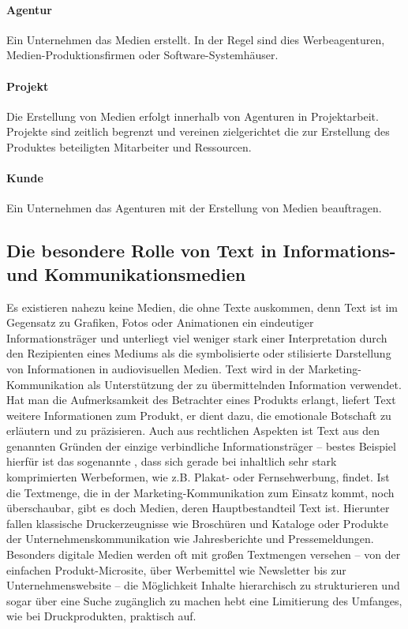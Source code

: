 \paragraph{Agentur} Ein Unternehmen das Medien erstellt. In der Regel sind dies Werbeagenturen, Medien-Produktionsfirmen oder Software-Systemhäuser. 

\paragraph{Projekt} Die Erstellung von Medien erfolgt innerhalb von Agenturen in Projektarbeit. Projekte sind zeitlich begrenzt und vereinen zielgerichtet die zur Erstellung des Produktes beteiligten Mitarbeiter und Ressourcen. 

\paragraph{Kunde} Ein Unternehmen das Agenturen mit der Erstellung von Medien beauftragen.

\subsection{Die besondere Rolle von Text in Informations- und Kommunikationsmedien}

Es existieren nahezu keine Medien, die ohne Texte auskommen, denn Text ist im Gegensatz zu Grafiken, Fotos oder Animationen ein eindeutiger Informationsträger und unterliegt viel weniger stark einer Interpretation durch den Rezipienten eines Mediums als die symbolisierte oder stilisierte Darstellung von Informationen in audiovisuellen Medien. Text wird in der Marketing-Kommunikation als Unterstützung der zu übermittelnden Information verwendet. Hat man die Aufmerksamkeit des Betrachter eines Produkts erlangt, liefert Text weitere Informationen zum Produkt, er dient dazu, die emotionale Botschaft zu erläutern und zu präzisieren. Auch aus rechtlichen Aspekten ist Text aus den genannten Gründen der einzige verbindliche Informationsträger – bestes Beispiel hierfür ist das sogenannte , dass sich gerade bei inhaltlich sehr stark komprimierten Werbeformen, wie z.B. Plakat- oder Fernsehwerbung, findet. Ist die Textmenge, die in der Marketing-Kommunikation zum Einsatz kommt, noch überschaubar, gibt es doch Medien, deren Hauptbestandteil Text ist. Hierunter fallen klassische Druckerzeugnisse wie Broschüren und Kataloge oder Produkte der Unternehmenskommunikation wie Jahresberichte und Pressemeldungen. Besonders digitale Medien werden oft mit großen Textmengen versehen – von der einfachen Produkt-Microsite, über Werbemittel wie Newsletter bis zur Unternehmenswebsite – die Möglichkeit Inhalte hierarchisch zu strukturieren und sogar über eine Suche zugänglich zu machen hebt eine Limitierung des Umfanges, wie bei Druckprodukten, praktisch auf.

